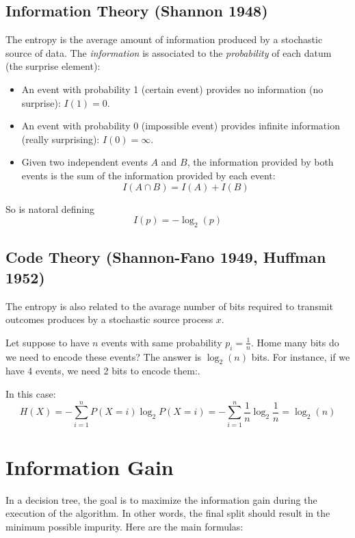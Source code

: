 \subsection{Information Theory (Shannon 1948)}
The entropy is the average amount of information produced by a stochastic source of data. The \textit{information} is associated to the \textit{probability} of each datum (the surprise element):
\begin{itemize}
    \item An event with probability 1 (certain event) provides no information (no surprise): \(I(1)=0\).
    \item An event with probability 0 (impossible event) provides infinite information (really surprising): \(I(0)=\infty\).
    \item Given two independent events \(A\) and \(B\), the information provided by both events is the sum of the information provided by each event:
    \[
        I(A \cap B) = I(A) + I(B)
    \]
\end{itemize}
So is natoral defining 
\[
    I(p) = -\log_2(p)
\]
\subsection{Code Theory (Shannon-Fano 1949, Huffman 1952)}
The entropy is also related to the avarage number of bits required to transmit outcomes produces by a stochastic source process $x$.

Let suppose to have $n$ events with same probability \(p_i = \frac{1}{n}\). Home many bits do we need to encode these events? The answer is \(\log_2(n)\) bits. For instance, if we have 4 events, we need 2 bits to encode them:.

In this case:
\[
    H(X) = -\sum_{i=1}^{n} P(X=i)\log_2 P(X=i) = - \sum_{i=1}^{n} \frac{1}{n} \log_2 \frac{1}{n} = \log_2(n)
\]

\section{Information Gain}

In a decision tree, the goal is to maximize the information gain during the execution of the algorithm. 
In other words, the final split should result in the minimum possible impurity. 
Here are the main formulas:



